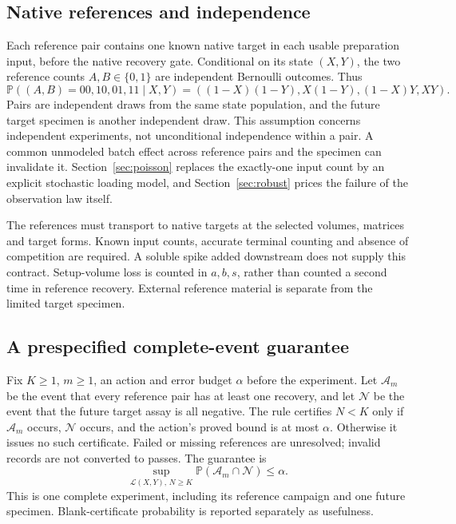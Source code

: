 \documentclass[11pt]{article}
\theoremstyle{remark}\newtheorem{remark}[theorem]{Remark}
\newcommand{\Prob}{\mathbb P}
\newcommand{\Neg}{\mathcal N}
\begin{document}
\subsection{Native references and independence}\label{sec:refs}
Each reference pair contains one known native target in each usable preparation
input, before the native recovery gate. Conditional on its state $(X,Y)$, the two
reference counts $A,B\in\{0,1\}$ are independent Bernoulli outcomes. Thus
\begin{equation}\label{eq:reference}
\Prob((A,B)=00,10,01,11\mid X,Y)
=((1-X)(1-Y),X(1-Y),(1-X)Y,XY).
\end{equation}
Pairs are independent draws from the same state population, and the future target
specimen is another independent draw. This assumption concerns independent
experiments, not unconditional independence within a pair. A common unmodeled
batch effect across reference pairs and the specimen can invalidate it.
Section~\ref{sec:poisson} replaces the exactly-one input count by an explicit
stochastic loading model, and Section~\ref{sec:robust} prices the failure of the
observation law itself.

The references must transport to native targets at the selected volumes, matrices
and target forms. Known input counts, accurate terminal counting and absence of
competition are required. A soluble spike added downstream does not supply this
contract. Setup-volume loss is counted in $a,b,s$, rather than counted a second
time in reference recovery. External reference material is separate from the
limited target specimen.

\subsection{A prespecified complete-event guarantee}
Fix $K\ge1$, $m\ge1$, an action and error budget $\alpha$ before the experiment.
Let $\mathcal A_m$ be the event that every reference pair has at least one
recovery, and let $\Neg$ be the event that the future target assay is all
negative. The rule certifies $N<K$ only if $\mathcal A_m$ occurs, $\Neg$ occurs,
and the action's proved bound is at most $\alpha$. Otherwise it issues no such
certificate. Failed or missing references are unresolved; invalid records are not
converted to passes. The guarantee is
\begin{equation}\label{eq:error}
\sup_{\mathcal L(X,Y),\,N\ge K}\Prob(\mathcal A_m\cap\Neg)\le\alpha.
\end{equation}
This is one complete experiment, including its reference campaign and one future
specimen. Blank-certificate probability is reported separately as usefulness.
\end{document}
